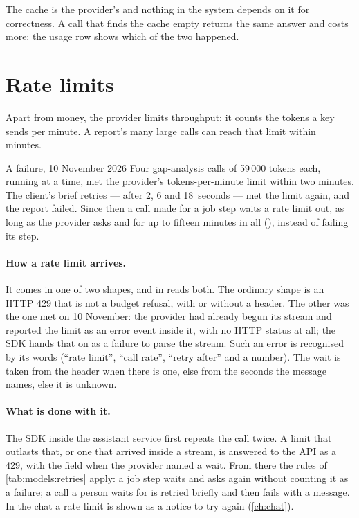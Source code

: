 The cache is the provider's and nothing in the system depends on it for correctness. A call
that finds the cache empty returns the same answer and costs more; the usage row shows which
of the two happened.


\section{Rate limits}\label{sec:models:ratelimits}

Apart from money, the provider limits throughput: it counts the tokens a key sends per
minute. A report's many large calls can reach that limit within minutes.

\begin{lessonbox}{A failure, 10 November 2026}
Four gap-analysis calls of 59\,000 tokens each, running at a time, met the provider's
tokens-per-minute limit within two minutes. The client's brief retries --- after 2, 6 and
18~seconds --- met the limit again, and the report failed. Since then a call made for a job
step waits a rate limit out, as long as the provider asks and for up to fifteen minutes in all
(), instead of failing its step.
\end{lessonbox}

\paragraph{How a rate limit arrives.} It comes in one of two shapes, and
 in  reads both. The ordinary shape is an HTTP
429 that is not a budget refusal, with or without a  header. The other was the
one met on 10 November: the provider had already begun its stream and reported the limit as
an error event inside it, with no HTTP status at all; the SDK hands that on as a failure to
parse the stream. Such an error is recognised by its words (\enquote{rate limit},
\enquote{call rate}, \enquote{retry after} and a number). The wait is taken from the header
when there is one, else from the seconds the message names, else it is unknown.

\paragraph{What is done with it.} The SDK inside the assistant service first repeats the call
twice. A limit that outlasts that, or one that arrived inside a stream, is answered to the API
as a 429, with the field  when the provider named a wait. From there the rules of \cref{tab:models:retries}
apply: a job step waits and asks again without counting it as a failure; a call a person
waits for is retried briefly and then fails with a message. In the chat a rate limit is shown
as a notice to try again (\cref{ch:chat}).

